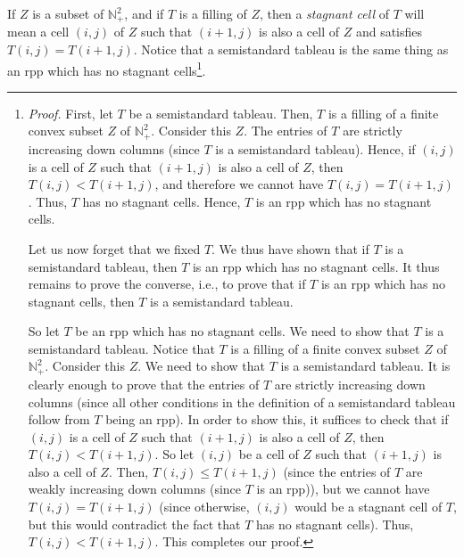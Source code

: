 \documentclass[numbers=enddot,12pt,final,onecolumn,notitlepage]{scrartcl}%
\theoremstyle{definition}
\newenvironment{verlong}{}{}
\begin{document}
\begin{verlong}
If $Z$ is a subset of $\mathbb{N}_{+}^{2}$, and if $T$ is a filling of $Z$,
then a \textit{stagnant cell} of $T$ will mean a cell $\left(  i,j\right)  $
of $Z$ such that $\left(  i+1,j\right)  $ is also a cell of $Z$ and satisfies
$T\left(  i,j\right)  =T\left(  i+1,j\right)  $. Notice that a semistandard
tableau is the same thing as an rpp which has no stagnant
cells\footnote{\textit{Proof.} First, let $T$ be a semistandard tableau. Then,
$T$ is a filling of a finite convex subset $Z$ of $\mathbb{N}_{+}^{2}$.
Consider this $Z$. The entries of $T$ are strictly increasing down columns
(since $T$ is a semistandard tableau). Hence, if $\left(  i,j\right)  $ is a
cell of $Z$ such that $\left(  i+1,j\right)  $ is also a cell of $Z$, then
$T\left(  i,j\right)  <T\left(  i+1,j\right)  $, and therefore we cannot have
$T\left(  i,j\right)  =T\left(  i+1,j\right)  $. Thus, $T$ has no stagnant
cells. Hence, $T$ is an rpp which has no stagnant cells.
\par
Let us now forget that we fixed $T$. We thus have shown that if $T$ is a
semistandard tableau, then $T$ is an rpp which has no stagnant cells. It thus
remains to prove the converse, i.e., to prove that if $T$ is an rpp which has
no stagnant cells, then $T$ is a semistandard tableau.
\par
So let $T$ be an rpp which has no stagnant cells. We need to show that $T$ is
a semistandard tableau. Notice that $T$ is a filling of a finite convex subset
$Z$ of $\mathbb{N}_{+}^{2}$. Consider this $Z$. We need to show that $T$ is a
semistandard tableau. It is clearly enough to prove that the entries of $T$
are strictly increasing down columns (since all other conditions in the
definition of a semistandard tableau follow from $T$ being an rpp). In order
to show this, it suffices to check that if $\left(  i,j\right)  $ is a cell of
$Z$ such that $\left(  i+1,j\right)  $ is also a cell of $Z$, then $T\left(
i,j\right)  <T\left(  i+1,j\right)  $. So let $\left(  i,j\right)  $ be a cell
of $Z$ such that $\left(  i+1,j\right)  $ is also a cell of $Z$. Then,
$T\left(  i,j\right)  \leq T\left(  i+1,j\right)  $ (since the entries of $T$
are weakly increasing down columns (since $T$ is an rpp)), but we cannot have
$T\left(  i,j\right)  =T\left(  i+1,j\right)  $ (since otherwise, $\left(
i,j\right)  $ would be a stagnant cell of $T$, but this would contradict the
fact that $T$ has no stagnant cells). Thus, $T\left(  i,j\right)  <T\left(
i+1,j\right)  $. This completes our proof.}.
\end{verlong}
\end{document}
